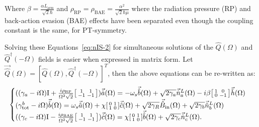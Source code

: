 Where $\beta=\frac{\alpha L_\mathrm{arm}}{\sqrt{2}\hbar}$ and $\rho_\mathrm{RP}=\rho_\mathrm{BAE}=\frac{\alpha^2}{\sqrt{2}\hbar\mu}$ where the radiation pressure (RP) and back-action evasion (BAE) effects have been separated even though the coupling constant is the same, for PT-symmetry.

Solving these Equations~\ref{eq:nIS-2} for simultaneous solutions of the $\hat{Q}(\Omega)$ and $\hat{Q}^\dag(-\Omega)$ fields is easier when expressed in matrix form. Let $\vec{\hat{Q}}(\Omega)=[\hat{Q}(\Omega),\hat{Q}^\dag(-\Omega)]^T$, then the above equations can be re-written as:
$$\begin{cases}
\label{eq:nIS-3}
((\gamma_a-i\Omega)\mathrm{I}+\frac{i\rho_\mathrm{RP}}{\Omega^2 \sqrt{2}}\begin{bsmallmatrix}
1 & 1 \\ 
-1 & -1
\end{bsmallmatrix})\vec{\hat{a}}(\Omega)=-\omega_s\vec{\hat{b}}(\Omega) + \sqrt{2\gamma_a}\vec{\hat{n}}^L_a(\Omega)-i\beta\begin{bsmallmatrix}
1 & 0 \\ 
0 & -1
\end{bsmallmatrix}\vec{\tilde{h}}(\Omega)\\
(\gamma^b_\mathrm{tot}-i\Omega)\vec{\hat{b}}(\Omega)=\omega_s\vec{\hat{a}}(\Omega) + \chi\begin{bsmallmatrix}
0 & 1 \\ 
1 & 0
\end{bsmallmatrix}\vec{\hat{c}}(\Omega) + \sqrt{2\gamma_R}\vec{\hat{B}}_\mathrm{in}(\Omega) + \sqrt{2\gamma_b}\vec{\hat{n}}^L_b(\Omega)\\
((\gamma_c-i\Omega)\mathrm{I}-\frac{i\rho_\mathrm{BAE}}{\Omega^2\sqrt{2}}\begin{bsmallmatrix}
1 & 1 \\ 
-1 & -1
\end{bsmallmatrix})\vec{\hat{c}}(\Omega)=\chi\begin{bsmallmatrix}
0 & 1 \\ 
1 & 0
\end{bsmallmatrix}\vec{\hat{b}}(\Omega) + \sqrt{2\gamma_c}\vec{\hat{n}}^L_c(\Omega).
\end{cases}$$

